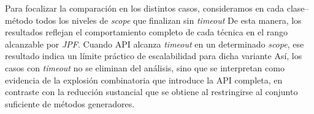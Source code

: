

Para focalizar la comparación en los distintos casos, 
consideramos en cada clase–método todos los niveles de \emph{scope} que finalizan sin \emph{timeout}
De esta manera, los resultados reflejan el comportamiento completo de cada técnica en el rango alcanzable por \emph{JPF}. 
Cuando \textsf{API} alcanza \emph{timeout} en un determinado \emph{scope}, ese resultado indica un límite práctico 
de escalabilidad para dicha variante
Así, los casos con \emph{timeout} no se eliminan del análisis, 
sino que se interpretan como evidencia de la explosión combinatoria que introduce la API completa, 
en contraste con la reducción sustancial que se obtiene al restringirse al conjunto suficiente de métodos generadores.

